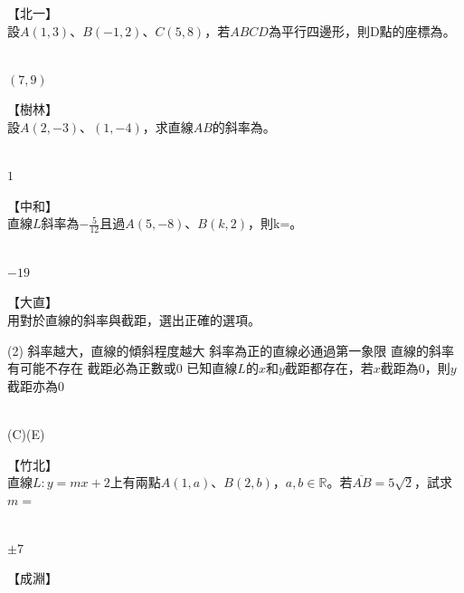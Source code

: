 \documentclass
[answers]
{exam}
\newcommand\ul[1]{\uline{\hspace*{#1}}}
\theoremstyle{definition}
\begin{document}
\begin{questions}

\question
【北一】\\設$A \left( 1,3\right)$、$B \left( -1,2\right)$、$C \left( 5,8\right)$，若$ABCD$為平行四邊形，則D點的座標為\ul{50pt}。

\begin{solution}~\\
	$\left( 7,9 \right)$
\end{solution}

\question
【樹林】\\
設$A\left( 2,-3\right)$、$\left( 1,-4\right)$，求直線$AB$的斜率為\ul{50pt}。

\begin{solution}~\\
	$1$
\end{solution}


\question
【中和】\\
直線$L$斜率為$-\frac{5}{12}$且過$A\left( 5,-8\right)$、$B \left( k,2\right)$，則k=\ul{50pt}。
\begin{solution}~\\
	$-19$
\end{solution}


\question
【大直】\\
用對於直線的斜率與截距，選出正確的選項。
\begin{tasks}(2)
	\task 斜率越大，直線的傾斜程度越大
	\task 斜率為正的直線必通過第一象限
	\task 直線的斜率有可能不存在
	\task 截距必為正數或$0$
	\task 已知直線$L$的$x$和$y$截距都存在，若$x$截距為$0$，則$y$截距亦為$0$
\end{tasks}
\begin{solution}~\\
	(C)(E)
\end{solution}

\question
【竹北】\\
直線$L:y=mx + 2$上有兩點$A \left( 1,a\right)$、$B \left( 2,b \right)$，$a,b \in \mathbb{R}$。若$\overline{AB}=5\sqrt{2}$，試求$m=$\ul{50pt}
\begin{solution}~\\
	$\pm7$
\end{solution}

\question
【成淵】\\


\end{questions}
\end{document}

